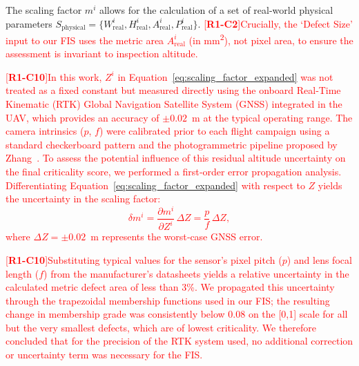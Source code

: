 \documentclass[energies,article,submit,pdftex,moreauthors]{Definitions/mdpi}
\newcommand{\revtag}[2]{[\textbf{R#1-C#2}]}
\newcommand{\Rone}[1]{\textcolor{red}{#1}}
\begin{document}
The scaling factor \(m^i\) allows for the calculation of a set of real-world physical parameters \(S_{\text{physical}} = \{W^i_{\text{real}}, H^i_{\text{real}}, A^i_{\text{real}}, P^i_{\text{real}}\}\). \Rone{\revtag{1}{2}Crucially, the `Defect Size' input to our FIS uses the metric area \(A^i_{\text{real}}\) (in \si{mm^2}), not pixel area, to ensure the assessment is invariant to inspection altitude.}

\Rone{\revtag{1}{10}In this work, \(Z^i\) in Equation~\ref{eq:scaling_factor_expanded} was not treated as a fixed constant but measured directly using the onboard Real‑Time Kinematic (RTK) Global Navigation Satellite System (GNSS) integrated in the UAV, which provides an accuracy of \(\pm 0.02\)~m at the typical operating range. The camera intrinsics (\(p\), \(f\)) were calibrated prior to each flight campaign using a standard checkerboard pattern and the photogrammetric pipeline proposed by Zhang~\cite{Zhang2000Calibration}. To assess the potential influence of this residual altitude uncertainty on the final criticality score, we performed a first‑order error propagation analysis. Differentiating Equation~\ref{eq:scaling_factor_expanded} with respect to \(Z\) yields the uncertainty in the scaling factor:
\begin{equation}
  \delta m^i = \frac{\partial m^i}{\partial Z^i} \,\Delta Z = \frac{p}{f}\,\Delta Z,
\end{equation}
where \(\Delta Z = \pm 0.02\)~m represents the worst‑case GNSS error.}

\Rone{\revtag{1}{10}Substituting typical values for the sensor's pixel pitch (\(p\)) and lens focal length (\(f\)) from the manufacturer's datasheets yields a relative uncertainty in the calculated metric defect area of less than 3\%. We propagated this uncertainty through the trapezoidal membership functions used in our FIS; the resulting change in membership grade was consistently below 0.08 on the [0,1] scale for all but the very smallest defects, which are of lowest criticality. We therefore concluded that for the precision of the RTK system used, no additional correction or uncertainty term was necessary for the FIS.}
\end{document}
